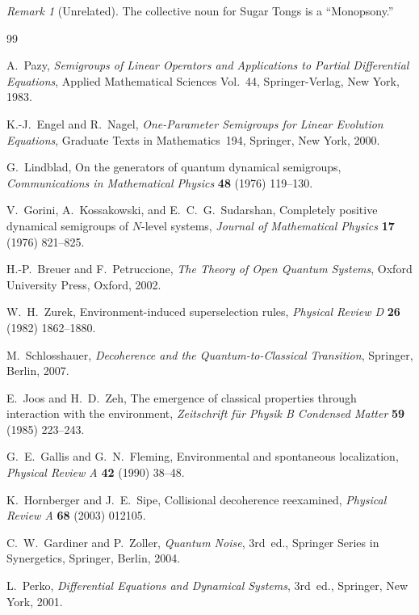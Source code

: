 \documentclass[11pt]{article}
\theoremstyle{definition}
\theoremstyle{remark}
\newtheorem{remark}[theorem]{Remark}
\begin{document}
\begin{remark}[Unrelated]
The collective noun for Sugar Tongs is a ``Monopsony.''
\end{remark}

\begin{thebibliography}{99}

A.~Pazy,
\textit{Semigroups of Linear Operators and Applications to Partial Differential Equations},
Applied Mathematical Sciences Vol.~44,
Springer-Verlag, New York, 1983.

K.-J.~Engel and R.~Nagel,
\textit{One-Parameter Semigroups for Linear Evolution Equations},
Graduate Texts in Mathematics~194,
Springer, New York, 2000.

G.~Lindblad,
On the generators of quantum dynamical semigroups,
\textit{Communications in Mathematical Physics} \textbf{48} (1976) 119--130.

V.~Gorini, A.~Kossakowski, and E.~C.~G.~Sudarshan,
Completely positive dynamical semigroups of $N$-level systems,
\textit{Journal of Mathematical Physics} \textbf{17} (1976) 821--825.

H.-P.~Breuer and F.~Petruccione,
\textit{The Theory of Open Quantum Systems},
Oxford University Press, Oxford, 2002.

W.~H.~Zurek,
Environment-induced superselection rules,
\textit{Physical Review D} \textbf{26} (1982) 1862--1880.

M.~Schlosshauer,
\textit{Decoherence and the Quantum-to-Classical Transition},
Springer, Berlin, 2007.

E.~Joos and H.~D.~Zeh,
The emergence of classical properties through interaction with the environment,
\textit{Zeitschrift f\"ur Physik B Condensed Matter} \textbf{59} (1985) 223--243.

G.~E.~Gallis and G.~N.~Fleming,
Environmental and spontaneous localization,
\textit{Physical Review A} \textbf{42} (1990) 38--48.

K.~Hornberger and J.~E.~Sipe,
Collisional decoherence reexamined,
\textit{Physical Review A} \textbf{68} (2003) 012105.

C.~W.~Gardiner and P.~Zoller,
\textit{Quantum Noise}, 3rd~ed.,
Springer Series in Synergetics,
Springer, Berlin, 2004.

L.~Perko,
\textit{Differential Equations and Dynamical Systems}, 3rd~ed.,
Springer, New York, 2001.

\end{thebibliography}
\end{document}
